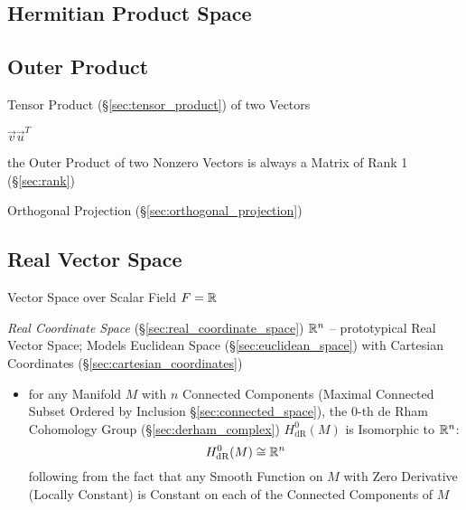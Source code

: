 \subsection{Hermitian Product Space}\label{sec:hermitian_product_space}

\subsection{Outer Product}\label{sec:outer_product}

Tensor Product (\S\ref{sec:tensor_product}) of two Vectors

$\vec{v}\vec{u}^T$

the Outer Product of two Nonzero Vectors is always a Matrix of Rank 1
(\S\ref{sec:rank})

\fist Orthogonal Projection (\S\ref{sec:orthogonal_projection})



\subsection{Real Vector Space}\label{sec:real_vector_space}

Vector Space over Scalar Field $F = \mathbb{R}$

\fist \emph{Real Coordinate Space} (\S\ref{sec:real_coordinate_space})
$\mathbb{R}^n$ -- prototypical Real Vector Space; Models Euclidean Space
(\S\ref{sec:euclidean_space}) with Cartesian Coordinates
(\S\ref{sec:cartesian_coordinates})

\begin{itemize}
  \item for any Manifold $M$ with $n$ Connected Components (Maximal Connected
    Subset Ordered by Inclusion \S\ref{sec:connected_space}), the $0$-th de Rham
    Cohomology Group (\S\ref{sec:derham_complex}) $H_{\mathrm{dR}}^0(M)$ is
    Isomorphic to $\mathbb{R}^n$:
    \[
      H_{\mathrm{dR}}^0(M) \cong \mathbb{R}^n
    \]
    following from the fact that any Smooth Function on $M$ with Zero Derivative
    (Locally Constant) is Constant on each of the Connected Components of $M$
\end{itemize}


